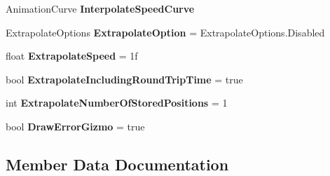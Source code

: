 \begin{DoxyCompactItemize}
\item 
Animation\+Curve {\bfseries Interpolate\+Speed\+Curve}
\item 
Extrapolate\+Options {\bfseries Extrapolate\+Option} = Extrapolate\+Options.\+Disabled\hypertarget{class_photon_transform_view_position_model_a5d3b8ed9c1fb9c3f352cb460489a823b}{}\label{class_photon_transform_view_position_model_a5d3b8ed9c1fb9c3f352cb460489a823b}

\item 
float {\bfseries Extrapolate\+Speed} = 1f\hypertarget{class_photon_transform_view_position_model_adebb0a46d4de507ec529fdd3a87e192d}{}\label{class_photon_transform_view_position_model_adebb0a46d4de507ec529fdd3a87e192d}

\item 
bool {\bfseries Extrapolate\+Including\+Round\+Trip\+Time} = true\hypertarget{class_photon_transform_view_position_model_a7b871135ff0f36dfd41c5148b36612f7}{}\label{class_photon_transform_view_position_model_a7b871135ff0f36dfd41c5148b36612f7}

\item 
int {\bfseries Extrapolate\+Number\+Of\+Stored\+Positions} = 1\hypertarget{class_photon_transform_view_position_model_a41cbf435a32e015857f534d3bd9e289c}{}\label{class_photon_transform_view_position_model_a41cbf435a32e015857f534d3bd9e289c}

\item 
bool {\bfseries Draw\+Error\+Gizmo} = true\hypertarget{class_photon_transform_view_position_model_a24067fa6f667e913da06fac06773e483}{}\label{class_photon_transform_view_position_model_a24067fa6f667e913da06fac06773e483}

\end{DoxyCompactItemize}


\subsection{Member Data Documentation}
